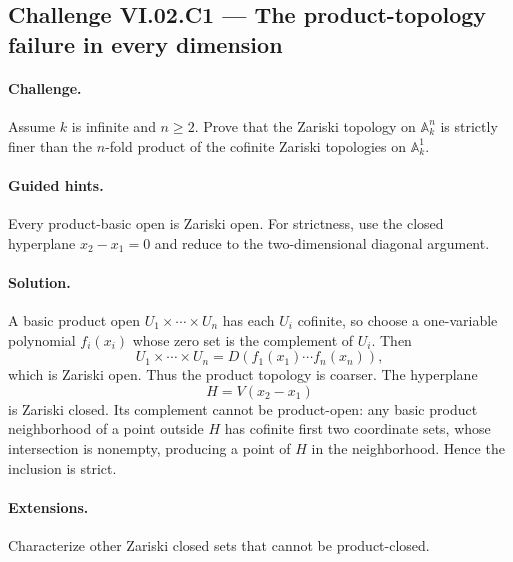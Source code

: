 \subsection*{Challenge VI.02.C1 --- The product-topology failure in every dimension}
\label{chal:vi02-c1}

\paragraph{Challenge.}
Assume \(k\) is infinite and \(n\ge2\).  Prove that the Zariski topology on
\(\mathbb A_k^n\) is strictly finer than the \(n\)-fold product of the cofinite Zariski
topologies on \(\mathbb A_k^1\).

\ifdefined\FullProblemDossiers
\paragraph{Guided hints.}
Every product-basic open is Zariski open.  For strictness, use the closed hyperplane
\(x_2-x_1=0\) and reduce to the two-dimensional diagonal argument.

\paragraph{Solution.}
A basic product open \(U_1\times\cdots\times U_n\) has each \(U_i\) cofinite, so choose a
one-variable polynomial \(f_i(x_i)\) whose zero set is the complement of \(U_i\).  Then
\[
U_1\times\cdots\times U_n=D(f_1(x_1)\cdots f_n(x_n)),
\]
which is Zariski open.  Thus the product topology is coarser.  The hyperplane
\[
H=V(x_2-x_1)
\]
is Zariski closed.  Its complement cannot be product-open: any basic product neighborhood
of a point outside \(H\) has cofinite first two coordinate sets, whose intersection is
nonempty, producing a point of \(H\) in the neighborhood.  Hence the inclusion is strict.

\paragraph{Extensions.}
Characterize other Zariski closed sets that cannot be product-closed.
\fi
